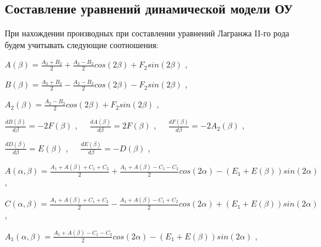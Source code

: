 \newpage

\subsection{Составление уравнений динамической модели ОУ} \label{sec:ch3/sec8}

При нахождении производных при составлении уравнений Лагранжа II-го рода будем учитывать следующие соотношения:


\( A \left(  \beta  \right) =\frac{A_{2}+B_{2}}{2}+\frac{A_{2}-B_{2}}{2}cos \left( 2 \beta  \right) +F_{2}sin \left( 2 \beta  \right)  \) ,\par

\( B \left(  \beta  \right) =\frac{A_{2}+B_{2}}{2}-\frac{A_{2}-B_{2}}{2}cos \left( 2 \beta  \right) -F_{2}sin \left( 2 \beta  \right)  \) ,\par

\( A_{2} \left(  \beta  \right) =\frac{A_{2}-B_{2}}{2}cos \left( 2 \beta  \right) +F_{2}sin \left( 2 \beta  \right)  \) ,\par

\( \frac{dB \left(  \beta  \right) }{d \beta }=-2F \left(  \beta  \right)  \) ,\ \ \   \( \frac{dA \left(  \beta  \right) }{d \beta }=2F \left(  \beta  \right)  \) ,\ \ \   \( \frac{dF \left(  \beta  \right) }{d \beta }=-2A_{2} \left(  \beta  \right)  \) ,\par

\( \frac{dD \left(  \beta  \right) }{d \beta }=E \left(  \beta  \right)  \) ,\ \ \   \( \frac{dE \left(  \beta  \right) }{d \beta }=-D \left(  \beta  \right)  \) ,\par

\( 
A \left(  \alpha , \beta  \right) =
\frac{A_{1}+A \left(  \beta  \right) +C_{1}+C_{2}}{2}+\frac{A_{1}+A \left(  \beta  \right) -C_{1}-C_{2}}{2}cos \left( 2 \alpha  \right) - \left( E_{1}+E \left(  \beta  \right)  \right) sin \left( 2 \alpha  \right)  \) ,\par

\( C \left(  \alpha , \beta  \right) =\frac{A_{1}+A \left(  \beta  \right) +C_{1}+C_{2}}{2}-\frac{A_{1}+A \left(  \beta  \right) -C_{1}+C_{2}}{2}cos \left( 2 \alpha  \right) + \left( E_{1}+E \left(  \beta  \right)  \right) sin \left( 2 \alpha  \right)  \) ,\par

\( A_{1} \left(  \alpha , \beta  \right) =\frac{A_{1}+A \left(  \beta  \right) -C_{1}-C_{2}}{2}cos \left( 2 \alpha  \right) - \left( E_{1}+E \left(  \beta  \right)  \right) sin \left( 2 \alpha  \right)  \) ,\par

